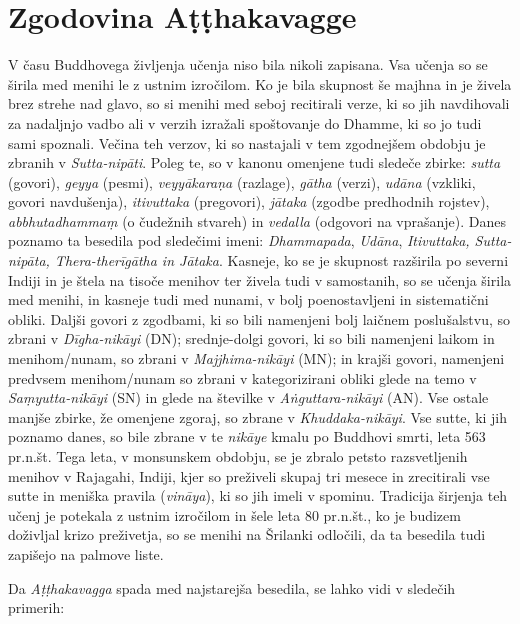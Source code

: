 \chapter{Zgodovina Aṭṭhakavagge}

V času Buddhovega življenja učenja niso bila nikoli zapisana. Vsa učenja
so se širila med menihi le z ustnim izročilom. Ko je bila skupnost še
majhna in je živela brez strehe nad glavo, so si menihi med seboj
recitirali verze, ki so jih navdihovali za nadaljnjo vadbo ali v verzih
izražali spoštovanje do Dhamme, ki so jo tudi sami spoznali. Večina teh
verzov, ki so nastajali v tem zgodnejšem obdobju je zbranih v
\emph{Sutta-nipāti}. Poleg te, so v kanonu omenjene tudi sledeče zbirke:
\emph{sutta} (govori), \emph{geyya} (pesmi), \emph{veyyākaraṇa}
(razlage), \emph{gātha} (verzi), \emph{udāna} (vzkliki, govori
navdušenja), \emph{itivuttaka} (pregovori), \emph{jātaka} (zgodbe
predhodnih rojstev), \emph{abbhutadhammaṃ} (o čudežnih stvareh) in
\emph{vedalla} (odgovori na vprašanje). Danes poznamo ta besedila pod
sledečimi imeni: \emph{Dhammapada}, \emph{Udāna}, \emph{Itivuttaka,
Sutta-nipāta, Thera-therīgātha in Jātaka}. Kasneje, ko se je skupnost
razširila po severni Indiji in je štela na tisoče menihov ter živela
tudi v samostanih, so se učenja širila med menihi, in kasneje tudi med
nunami, v bolj poenostavljeni in sistematični obliki. Daljši govori z
zgodbami, ki so bili namenjeni bolj laičnem poslušalstvu, so zbrani v
\emph{Dīgha-nikāyi} (DN); srednje-dolgi govori, ki so bili namenjeni
laikom in menihom/nunam, so zbrani v \emph{Majjhima-nikāyi} (MN); in
krajši govori, namenjeni predvsem menihom/nunam so zbrani v
kategorizirani obliki glede na temo v \emph{Saṃyutta-nikāyi} (SN) in
glede na številke v \emph{Aṅguttara-nikāyi} (AN). Vse ostale manjše
zbirke, že omenjene zgoraj, so zbrane v \emph{Khuddaka-nikāyi}. Vse
sutte, ki jih poznamo danes, so bile zbrane v te \emph{nikāye} kmalu po
Buddhovi smrti, leta 563 pr.n.št. Tega leta, v monsunskem obdobju, se je
zbralo petsto razsvetljenih menihov v Rajagahi, Indiji, kjer so
preživeli skupaj tri mesece in zrecitirali vse sutte in meniška pravila
(\emph{vināya}), ki so jih imeli v spominu. Tradicija širjenja teh učenj
je potekala z ustnim izročilom in šele leta 80 pr.n.št., ko je budizem
doživljal krizo preživetja, so se menihi na Šrilanki odločili, da ta
besedila tudi zapišejo na palmove liste.

Da \emph{Aṭṭhakavagga} spada med najstarejša besedila, se lahko vidi v
sledečih primerih:

